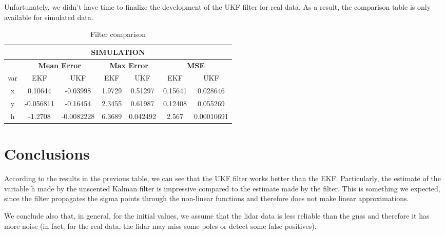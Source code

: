 \documentclass[conference]{IEEEtran}
\begin{document}
\noindent Unfortunately, we didn't have time to finalize the development of the UKF filter for real data. As a result, the comparison table is only available for simulated data.

\begin{table}[H]
\centering
\caption{Filter comparison}
\begin{tabular}{c|c|c|c|c|c|c} 
\multicolumn{7}{|c|}{\textbf{SIMULATION}}\\ \hline
 & \multicolumn{2}{|c|}{\textbf{Mean Error}} & \multicolumn{2}{|c|}{\textbf{Max Error}} & \multicolumn{2}{|c|}{\textbf{MSE}}\\ \hline
var & EKF & UKF & EKF & UKF & EKF & UKF \\ \hline
  x  & 0.10644 & -0.03998 & 1.9729 & 0.51297 & 0.15641 & 0.028646\\
  y   & -0.056811 & -0.16454 &  2.3455 & 0.61987 & 0.12408 & 0.055269 \\
  h   & -1.2708 & -0.0082228 &  6.3689 & 0.042492 & 2.567 & 0.00010691 \\
\end{tabular}

\end{table}

\vspace{3mm}

\section{Conclusions}

According to the results in the previous table, we can see that the UKF filter works better than the EKF. Particularly, the estimate of the variable h made by the unscented Kalman filter is impressive compared to the estimate made by the filter. This is something we expected, since the filter propagates the sigma points through the non-linear functions and therefore does not make linear approximations.

We conclude also that, in general, for the initial values, we assume that the lidar data is less reliable than the gnss and therefore it has more noise (in fact, for the real data, the lidar may miss some poles or detect some false positives).
\end{document}
